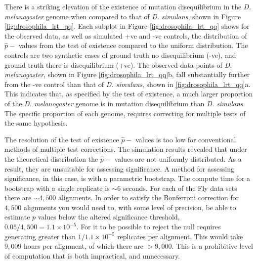 There is a striking elevation of the existence of mutation disequilibrium in the \textit{D. melanogaster} genome when compared to that of \textit{D. simulans}, shown in Figure \ref{fig:drosophila_lrt_qq}. Each subplot in Figure \ref{fig:drosophila_lrt_qq} shows for the observed data, as well as simulated +ve and -ve controls, the distribution of $\hat p-$ values from the test of existence compared to the uniform distribution. The controls are two synthetic cases of ground truth no disequilibrium (-ve), and ground truth there is disequilibrium (+ve). The observed data points of \textit{D. melanogaster}, shown in Figure \ref{fig:drosophila_lrt_qq}b, fall substantially further from the -ve control than that of \textit{D. simulans}, shown in \ref{fig:drosophila_lrt_qq}a. This indicates that, as specified by the test of existence, a much larger proportion of the \textit{D. melanogaster} genome is in mutation disequilibrium than \textit{D. simulans}. The specific proportion of each genome, requires correcting for multiple tests of the same hypothesis. 



The resolution of the test of existence $\hat p-$ values is too low for conventional methods of multiple test corrections. The simulation results revealed that under the theoretical distribution the $\hat p-$ values are not uniformly distributed. As a result, they are unsuitable for assessing significance. A method for assessing significance, in this case, is with a parametric bootstrap. The compute time for a bootstrap with a single replicate is ${\sim} 6$ seconds. For each of the Fly data sets there are ${\sim} 4,500$ alignments. In order to satisfy the Bonferroni correction for $4,500$ alignments you would need to, with some level of precision, be able to estimate $p$ values below the altered significance threshold, $0.05/4,500 = 1.1{\times}10^{-5}$. For it to be possible to reject the null requires generating greater than $1/1.1{\times}10^{-5}$ replicates per alignment. This would take $9,009$ hours per alignment, of which there are $>9,000$. This is a prohibitive level of computation that is both impractical, and unnecessary. 

